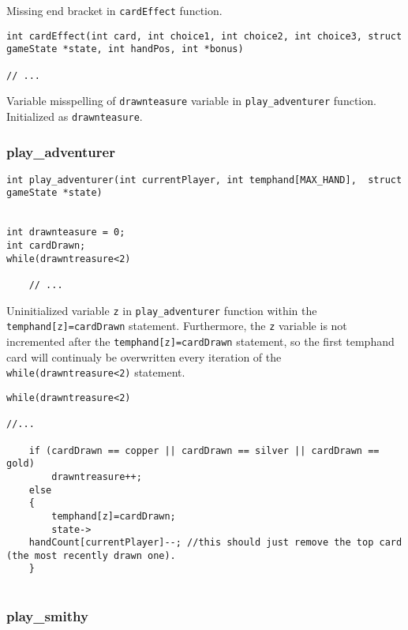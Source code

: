 \documentclass[11pt]{article}
\begin{document}
Missing end bracket in \texttt{cardEffect} function.

\begin{verbatim}
int cardEffect(int card, int choice1, int choice2, int choice3, struct gameState *state, int handPos, int *bonus)

// ...
\end{verbatim}


Variable misspelling of \texttt{drawnteasure} variable in \texttt{play\_adventurer} function. Initialized as \texttt{drawnteasure}.

\subsubsection{play\_adventurer}
\label{sec:playadventurer}

\begin{verbatim}
int play_adventurer(int currentPlayer, int temphand[MAX_HAND],  struct gameState *state)


int drawnteasure = 0;
int cardDrawn;
while(drawntreasure<2)

    // ...
\end{verbatim}

Uninitialized variable \texttt{z} in \texttt{play\_adventurer} function within the \texttt{temphand[z]=cardDrawn} statement. Furthermore, the \texttt{z} variable is not incremented after the \texttt{temphand[z]=cardDrawn} statement, so the first temphand card will continualy be overwritten every iteration of the \texttt{while(drawntreasure<2)} statement.


\begin{verbatim}
while(drawntreasure<2)

//...

    if (cardDrawn == copper || cardDrawn == silver || cardDrawn == gold)
        drawntreasure++;
    else
    {
        temphand[z]=cardDrawn;
        state->
    handCount[currentPlayer]--; //this should just remove the top card (the most recently drawn one).
    }


\end{verbatim}

\subsubsection{play\_smithy}
\label{sec:playsmithy}
\end{document}
